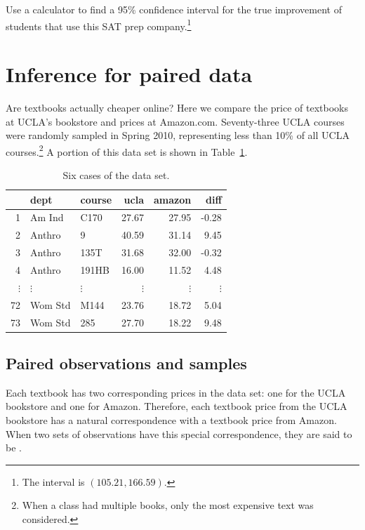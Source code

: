\begin{exercise}Use a calculator to find a 95\% confidence interval for the true improvement of students that use this SAT prep company.\footnote{The interval is $(105.21, 166.59)$.}
\end{exercise}

\section{Inference for paired data}
\label{pairedData}



Are textbooks actually cheaper online? Here we compare the price of textbooks at UCLA's bookstore and prices at Amazon.com. Seventy-three UCLA courses were randomly sampled in Spring 2010, representing less than 10\% of all UCLA courses.\footnote{When a class had multiple books, only the most expensive text was considered.} A portion of this data set is shown in Table~\ref{textbooksDF}.

\begin{table}[h]
\centering
\begin{tabular}{rllrrr}
  \hline
 & dept & course & ucla & amazon & diff \\
  \hline
1 & Am Ind &  C170 & 27.67 & 27.95 & -0.28 \\
  2 & Anthro & 9 & 40.59 & 31.14 & 9.45 \\
  3 & Anthro & 135T & 31.68 & 32.00 & -0.32 \\
  4 & Anthro & 191HB & 16.00 & 11.52 & 4.48 \\
$\vdots$ & $\vdots$ & $\vdots$ & $\vdots$ & $\vdots$ & $\vdots$ \\
  72 & Wom Std & M144 & 23.76 & 18.72 & 5.04 \\
  73 & Wom Std & 285 & 27.70 & 18.22 & 9.48 \\
   \hline
\end{tabular}
\caption{Six cases of the  data set.}
\label{textbooksDF}
\end{table}

\subsection{Paired observations and samples}

Each textbook has two corresponding prices in the data set: one for the UCLA bookstore and one for Amazon. Therefore, each textbook price from the UCLA bookstore has a natural correspondence with a textbook price from Amazon. When two sets of observations have this special correspondence, they are said to be .


